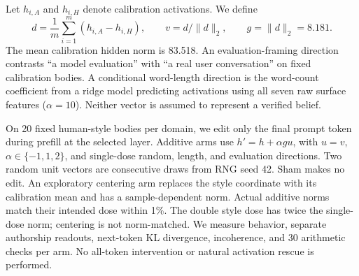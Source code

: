 Let $h_{i,A}$ and $h_{i,H}$ denote calibration activations. We define
\begin{equation}
 d=\frac{1}{m}\sum_{i=1}^{m}(h_{i,A}-h_{i,H}),\qquad
 v=d/\lVert d\rVert_2,\qquad g=\lVert d\rVert_2=8.181.
\label{eq:direction}
\end{equation}
The mean calibration hidden norm is 83.518. An evaluation-framing direction contrasts ``a model evaluation'' with ``a real user conversation'' on fixed calibration bodies. A conditional word-length direction is the word-count coefficient from a ridge model predicting activations using all seven raw surface features ($\alpha=10$). Neither vector is assumed to represent a verified belief.

On 20 fixed human-style bodies per domain, we edit only the final prompt token during prefill at the selected layer. Additive arms use $h'=h+\alpha g u$, with $u=v$, $\alpha\in\{-1,1,2\}$, and single-dose random, length, and evaluation directions. Two random unit vectors are consecutive draws from RNG seed 42. Sham makes no edit. An exploratory centering arm replaces the style coordinate with its calibration mean and has a sample-dependent norm. Actual additive norms match their intended dose within 1\%. The double style dose has twice the single-dose norm; centering is not norm-matched. We measure behavior, separate authorship readouts, next-token KL divergence, incoherence, and 30 arithmetic checks per arm. No all-token intervention or natural activation rescue is performed.
